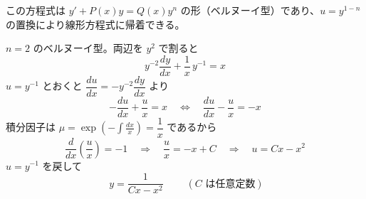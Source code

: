 
この方程式は $y' + P(x)y = Q(x)y^{n}$ の形（ベルヌーイ型）であり、$u = y^{1-n}$ の置換により線形方程式に帰着できる。

$n = 2$ のベルヌーイ型。両辺を $y^{2}$ で割ると
\[
y^{-2}\frac{dy}{dx} + \frac{1}{x}\,y^{-1} = x
\]
$u = y^{-1}$ とおくと $\dfrac{du}{dx} = -y^{-2}\dfrac{dy}{dx}$ より
\[
-\frac{du}{dx} + \frac{u}{x} = x
\quad\Longleftrightarrow\quad
\frac{du}{dx} - \frac{u}{x} = -x
\]
積分因子は $\mu = \exp\left(-\displaystyle\int \frac{dx}{x}\right) = \dfrac{1}{x}$ であるから
\[
\frac{d}{dx}\left(\frac{u}{x}\right) = -1
\quad\Longrightarrow\quad
\frac{u}{x} = -x + C
\quad\Longrightarrow\quad
u = Cx - x^{2}
\]
$u = y^{-1}$ を戻して
\[
\boxed{\; y = \frac{1}{Cx - x^{2}} \;}
\qquad (C \text{ は任意定数})
\]
